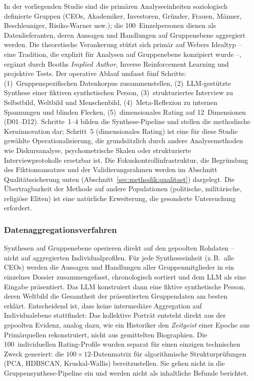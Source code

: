 \documentclass[12pt,a4paper]{article}
\begin{document}
In der vorliegenden Studie sind die prim\"aren Analyseeinheiten soziologisch definierte Gruppen (CEOs, Akademiker, Investoren, Gr\"under, Frauen, M\"anner, Beschleuniger, Risiko-Warner usw.); die 100~Einzelpersonen dienen als Datenlieferanten, deren Aussagen und Handlungen auf Gruppenebene aggregiert werden. Die theoretische Verankerung st\"utzt sich prim\"ar auf Webers Idealtyp -- eine Tradition, die explizit f\"ur Analysen auf Gruppenebene konzipiert wurde --, erg\"anzt durch Booths \emph{Implied Author}, Inverse Reinforcement Learning und projektive Tests. Der operative Ablauf umfasst f\"unf Schritte: (1)~Gruppenspezifischen Datenkorpus zusammenstellen, (2)~LLM-gest\"utzte Synthese einer fiktiven synthetischen Person, (3)~strukturiertes Interview zu Selbstbild, Weltbild und Menschenbild, (4)~Meta-Reflexion zu internen Spannungen und blinden Flecken, (5)~dimensionales Rating auf 12~Dimensionen (D01--D12). Schritte~1--4 bilden die Synthese-Pipeline und stellen die methodische Kerninnovation dar; Schritt~5 (dimensionales Rating) ist eine f\"ur diese Studie gew\"ahlte Operationalisierung, die grunds\"atzlich durch andere Analysemethoden wie Diskursanalyse, psychometrische Skalen oder strukturierte Interviewprotokolle ersetzbar ist. Die Fokuskontrollinfrastruktur, die Begr\"undung des Fiktionsansatzes und der Validierungsrahmen werden im Abschnitt Qualit\"atssicherung unten (Abschnitt~\ref{sec:methodik:qualitaet}) dargelegt. Die \"Ubertragbarkeit der Methode auf andere Populationen (politische, milit\"arische, religi\"ose Eliten) ist eine nat\"urliche Erweiterung, die gesonderte Untersuchung erfordert.

\subsubsection{Datenaggregationsverfahren}

Synthesen auf Gruppenebene operieren direkt auf den gepoolten Rohdaten -- nicht auf aggregierten Individualprofilen. F\"ur jede Syntheseeinheit (z.\,B.~\glqq alle CEOs\grqq) werden die Aussagen und Handlungen aller Gruppenmitglieder in ein einzelnes Dossier zusammengefasst, chronologisch sortiert und dem LLM als eine Eingabe pr\"asentiert. Das LLM konstruiert dann eine fiktive synthetische Person, deren Weltbild die Gesamtheit der pr\"asentierten Gruppendaten am besten erkl\"art. Entscheidend ist, dass keine intermedi\"are Aggregation auf Individualebene stattfindet: Das kollektive Portr\"at entsteht direkt aus der gepoolten Evidenz, analog dazu, wie ein Historiker den \emph{Zeitgeist} einer Epoche aus Prim\"arquellen rekonstruiert, nicht aus gemittelten Biographien. Die 100~individuellen Rating-Profile wurden separat f\"ur einen einzigen technischen Zweck generiert: die $100 \times 12$-Datenmatrix f\"ur algorithmische Strukturpr\"ufungen (PCA, HDBSCAN, Kruskal-Wallis) bereitzustellen. Sie gehen nicht in die Gruppensynthese-Pipeline ein und werden nicht als inhaltliche Befunde berichtet.
\end{document}
